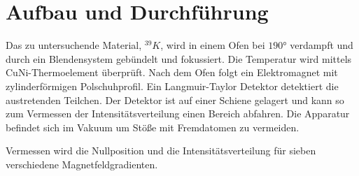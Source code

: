 \section{Aufbau und Durchführung}
\label{sec:Durchführung}
Das zu untersuchende Material, $^39K$, wird in einem Ofen bei $190\si{\degree}$
verdampft und durch ein Blendensystem gebündelt und fokussiert.
Die Temperatur wird mittels CuNi-Thermoelement überprüft.
Nach dem Ofen folgt ein Elektromagnet mit zylinderförmigen Polschuhprofil.
Ein Langmuir-Taylor Detektor detektiert die austretenden Teilchen.
Der Detektor ist auf einer Schiene gelagert und kann so zum Vermessen der Intensitätsverteilung einen Bereich abfahren.
Die Apparatur befindet sich im Vakuum um Stöße mit Fremdatomen zu vermeiden.

Vermessen wird die Nullposition und die Intensitätsverteilung für sieben verschiedene Magnetfeldgradienten.
